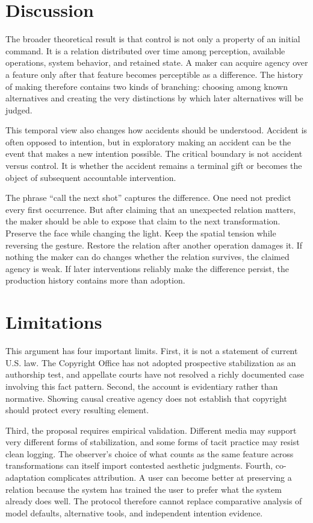 \documentclass[11pt]{article}
\begin{document}
\section{Discussion}
The broader theoretical result is that control is not only a property of an initial command. It is a relation distributed over time among perception, available operations, system behavior, and retained state. A maker can acquire agency over a feature only after that feature becomes perceptible as a difference. The history of making therefore contains two kinds of branching: choosing among known alternatives and creating the very distinctions by which later alternatives will be judged.

This temporal view also changes how accidents should be understood. Accident is often opposed to intention, but in exploratory making an accident can be the event that makes a new intention possible. The critical boundary is not accident versus control. It is whether the accident remains a terminal gift or becomes the object of subsequent accountable intervention.

The phrase ``call the next shot'' captures the difference. One need not predict every first occurrence. But after claiming that an unexpected relation matters, the maker should be able to expose that claim to the next transformation. Preserve the face while changing the light. Keep the spatial tension while reversing the gesture. Restore the relation after another operation damages it. If nothing the maker can do changes whether the relation survives, the claimed agency is weak. If later interventions reliably make the difference persist, the production history contains more than adoption.

\section{Limitations}
This argument has four important limits. First, it is not a statement of current U.S. law. The Copyright Office has not adopted prospective stabilization as an authorship test, and appellate courts have not resolved a richly documented case involving this fact pattern. Second, the account is evidentiary rather than normative. Showing causal creative agency does not establish that copyright should protect every resulting element.

Third, the proposal requires empirical validation. Different media may support very different forms of stabilization, and some forms of tacit practice may resist clean logging. The observer's choice of what counts as the same feature across transformations can itself import contested aesthetic judgments. Fourth, co-adaptation complicates attribution. A user can become better at preserving a relation because the system has trained the user to prefer what the system already does well. The protocol therefore cannot replace comparative analysis of model defaults, alternative tools, and independent intention evidence.
\end{document}
